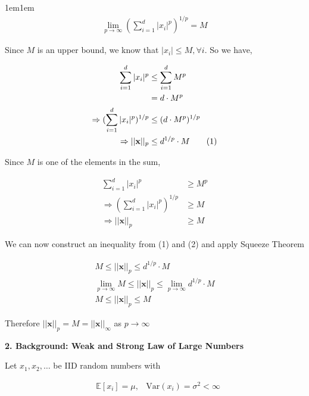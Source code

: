 \documentclass[11pt]{article}
\newcommand\numberthis{\addtocounter{equation}{1}\tag{\theequation}}
\begin{document}
\begin{adjustwidth}{1em}{1em}
    \begin{align*}
        \lim_{p\to\infty}\left(\sum_{i = 1}^d |x_i|^p\right)^{1/p} = M
    \end{align*}

    Since $M$ is an upper bound, we know that $|x_i| \leq M, \forall i$. So we have,

    \begin{align*}
        \sum_{i = 1}^d |x_i|^p &\leq \sum_{i = 1}^d M^p \\
                               &= d \cdot M^p \\ 
        \Rightarrow (\sum_{i = 1}^d |x_i|^p)^{1/p} &\leq (d\cdot M^p)^{1/p} \\ 
        \Rightarrow ||\mathbf{x}||_p &\leq d^{1/p} \cdot M \numberthis
    \end{align*}

    Since $M$ is one of the elements in the sum, 

    \begin{align*}
        \sum_{i = 1}^d |x_i|^p &\geq M^p \\ 
        \Rightarrow \left(\sum_{i = 1}^d |x_i|^p\right)^{1/p} &\geq M \\ 
        \Rightarrow ||\mathbf{x}||_p &\geq M
    \end{align*}

    We can now construct an inequality from (1) and (2) and apply Squeeze Theorem

    \begin{align*}
        M \leq ||\mathbf{x}||_p \leq d^{1/p} \cdot M \\ 
        \lim_{p\to\infty} M \leq ||\mathbf{x}||_p \leq \lim_{p\to\infty} d^{1/p} \cdot M \\ 
        M \leq ||\mathbf{x}||_p \leq M
    \end{align*}

    Therefore $||\mathbf{x}||_p = M = ||\mathbf{x}||_\infty$ as $p\to\infty$ \\

    \end{adjustwidth}

    \textbf{2. Background: Weak and Strong Law of Large Numbers}

    Let $x_1, x_2, \dots$ be IID random numbers with 

    \begin{align*}
        &\mathbb{E}[x_i] = \mu, &\text{Var}(x_i) = \sigma^2 < \infty
    \end{align*}
\end{document}
